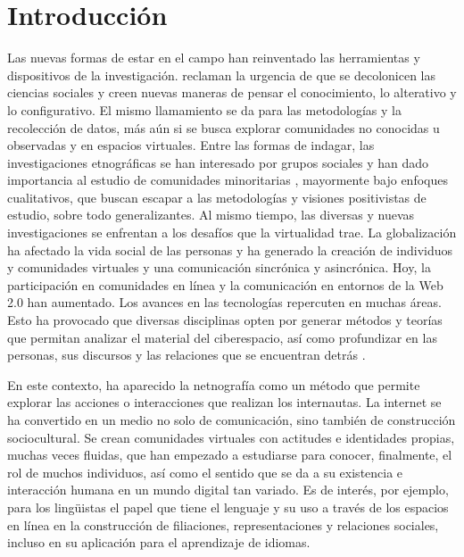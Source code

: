 \section{Introducción}\label{sec-introducción}

Las nuevas formas de estar en el campo han reinventado las herramientas
y dispositivos de la investigación. \textcite{ortizocana2019} reclaman la
urgencia de que se decolonicen las ciencias sociales y creen nuevas
maneras de pensar el conocimiento, lo alterativo y lo configurativo. El
mismo llamamiento se da para las metodologías y la recolección de datos,
más aún si se busca explorar comunidades no conocidas u observadas y en
espacios virtuales. Entre las formas de indagar, las investigaciones
etnográficas se han interesado por grupos sociales y han dado
importancia al estudio de comunidades minoritarias \cite{urzua2019}, 
mayormente bajo enfoques cualitativos, que buscan escapar a las metodologías y
visiones positivistas de estudio, sobre todo generalizantes. Al mismo
tiempo, las diversas y nuevas investigaciones se enfrentan a los
desafíos que la virtualidad trae. La globalización ha afectado la vida
social de las personas y ha generado la creación de individuos y
comunidades virtuales y una comunicación sincrónica y asincrónica. Hoy,
la participación en comunidades en línea y la comunicación en entornos
de la Web 2.0 han aumentado. Los avances en las tecnologías repercuten
en muchas áreas. Esto ha provocado que diversas disciplinas opten por
generar métodos y teorías que permitan analizar el material del
ciberespacio, así como profundizar en las personas, sus discursos y las
relaciones que se encuentran detrás \cite{lovón2023}.

En este contexto, ha aparecido la netnografía como un método que permite
explorar las acciones o interacciones que realizan los internautas. La
internet se ha convertido en un medio no solo de comunicación, sino
también de construcción sociocultural. Se crean comunidades virtuales
con actitudes e identidades propias, muchas veces fluidas, que han
empezado a estudiarse para conocer, finalmente, el rol de muchos
individuos, así como el sentido que se da a su existencia e interacción
humana en un mundo digital tan variado. Es de interés, por ejemplo, para
los lingüistas el papel que tiene el lenguaje y su uso a través de los
espacios en línea en la construcción de filiaciones, representaciones y
relaciones sociales, incluso en su aplicación para el aprendizaje de
idiomas.

